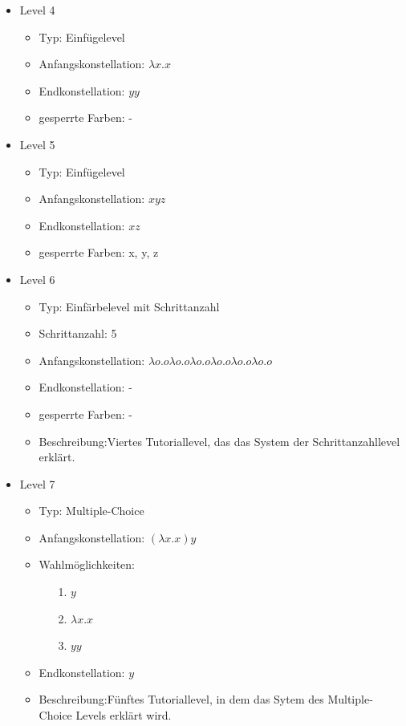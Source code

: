 \begin{itemize}
	\item{Level 4} 
		\begin{itemize}
			\item{Typ:} Einfügelevel
			\item{Anfangskonstellation:} \(\lambda x . x \)    
			\item{Endkonstellation:} \(y y\)
			\item{gesperrte Farben:} - 
		\end{itemize}

	\item{Level 5} 
		\begin{itemize}
			\item{Typ:} Einfügelevel
			\item{Anfangskonstellation:} \(x y z\)    
			\item{Endkonstellation:}  \(x z\)
			\item{gesperrte Farben:} x, y, z
		\end{itemize}

	\item{Level 6} 
		\begin{itemize}
			\item{Typ:} Einfärbelevel mit Schrittanzahl
			\item{Schrittanzahl:} 5
			\item{Anfangskonstellation:} \(\lambda o . o   \lambda o . o  \lambda o . o   \lambda o . o  \lambda o . o   \lambda o . o \) 
			\item{Endkonstellation:}  -
			\item{gesperrte Farben:} -
			\item{Beschreibung:}Viertes Tutoriallevel, das das System der Schrittanzahllevel erklärt.
		\end{itemize}

	\item{Level 7} 
		\begin{itemize}
			\item{Typ:} Multiple-Choice 
			\item{Anfangskonstellation:} \((\lambda x . x ) y\)    
			\item{Wahlmöglichkeiten:}  
				\begin{itemize}
					\item[1.] \(y\)
					\item[2.] \(\lambda x . x \) 
					\item[3.] \(y y\)
				\end{itemize}
			\item{Endkonstellation:} \(y\)
			\item{Beschreibung:}Fünftes Tutoriallevel, in dem das Sytem des Multiple-Choice Levels erklärt wird.
		\end{itemize}


\end{itemize}
